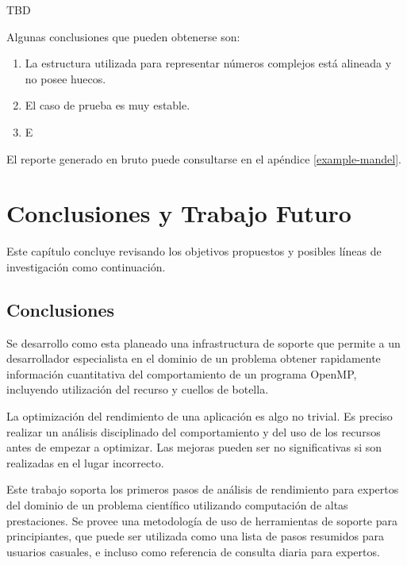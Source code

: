 \documentclass[a4paper]{report}
\begin{document}
TBD

\bigskip

Algunas conclusiones que pueden obtenerse son:

\begin{enumerate}
\item La estructura utilizada para representar números complejos está alineada y no posee huecos.
\item El caso de prueba es muy estable.
\item E
\end{enumerate}

\bigskip

El reporte generado en bruto puede consultarse en el apéndice \ref{example-mandel}.

\chapter{Conclusiones y Trabajo Futuro} \label{Conclusiones y Trabajo Futuro}

Este capítulo concluye revisando los objetivos propuestos y posibles líneas de investigación como continuación.

\section{Conclusiones}

Se desarrollo como esta planeado una infrastructura de soporte que permite a un desarrollador especialista en el dominio de un problema obtener rapidamente  información cuantitativa del comportamiento de un programa OpenMP, incluyendo utilización del recurso y cuellos de botella.

\bigskip

La optimización del rendimiento de una aplicación es algo no trivial.
Es preciso realizar un análisis disciplinado del comportamiento y del uso de los recursos antes de
empezar a optimizar. Las mejoras pueden ser no significativas si son realizadas en el lugar incorrecto.

\bigskip

Este trabajo soporta los primeros pasos de análisis de rendimiento para expertos del dominio de un problema científico utilizando computación de altas prestaciones. Se provee una metodología de uso de herramientas de soporte para principiantes, que puede ser utilizada como una lista de pasos resumidos para usuarios casuales, e incluso como referencia de consulta diaria para expertos.

\bigskip
\end{document}
